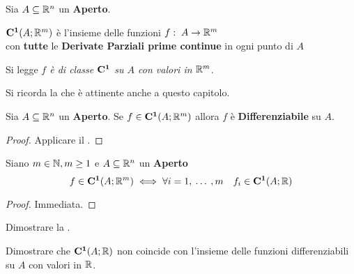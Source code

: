 \begin{definition}
	\label{def:cnt_class_1}
	Sia $A \subseteq \mathbb{R}^n$ un \textbf{Aperto}.
	\begin{center}
		$\mathbf{C^{1}}(A; \mathbb{R}^m)$ è l'insieme delle funzioni $f:\; A \to \mathbb{R}^m$\\
		con \textbf{tutte} le \textbf{Derivate Parziali prime continue} in ogni punto di $A$
	\end{center}
	Si legge \textit{$f$ è di classe $\mathbf{C^{1}}$ su $A$ con valori in $\mathbb{R}^m$}.
\end{definition}
\begin{observation}
	Si ricorda la  che è attinente anche a questo capitolo.
\end{observation}
\begin{corollary}
	Sia $A \subseteq \mathbb{R}^n$ un \textbf{Aperto}. Se $f \in \mathbf{C^{1}}(A;\mathbb{R}^m)$ allora $f$ è \textbf{Differenziabile} su $A$.
	\begin{proof}
		Applicare il .
	\end{proof}
\end{corollary}
\begin{proposition}
	\label{prop:cnt_class_components}
	Siano $m \in \mathbb{N}, m \geq 1$ e $A \subseteq \mathbb{R}^n$ un \textbf{Aperto}
	\[f \in \mathbf{C^{1}}(A; \mathbb{R}^m) \iff \forall i = 1,\:\dotsc\:, m \quad f_i \in \mathbf{C^{1}}(A;\mathbb{R})\]
	\begin{proof}
		Immediata.
	\end{proof}
\end{proposition}
\begin{exercise}
	Dimostrare la .
\end{exercise}
\begin{exercise}
	Dimostrare che $\mathbf{C^{1}}(A;\mathbb{R})$ non coincide con l'insieme delle funzioni differenziabili su $A$ con valori in $\mathbb{R}$.
\end{exercise}

